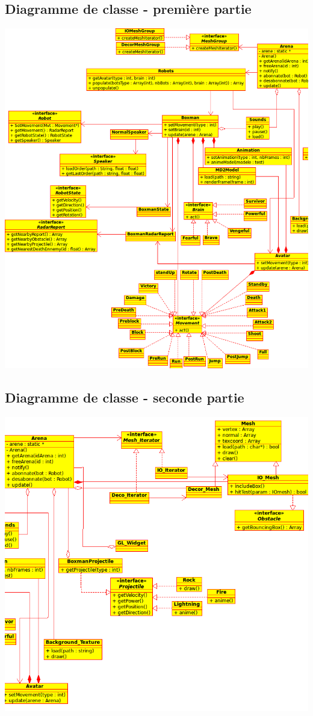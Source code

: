 \subsection{Diagramme de classe - première partie}
\vspace{0.5cm}
\hspace{-1.5cm}
\includegraphics[scale=0.7]{visuel/uml-diagramme-classe-part1.png}

\newpage
\hspace{0cm}
\subsection{Diagramme de classe - seconde partie}
\vspace{0.5cm}
\includegraphics[scale=0.7]{visuel/uml-diagramme-classe-part2.png}
